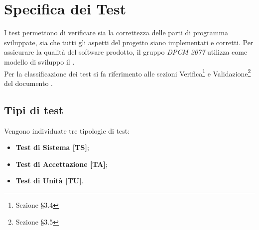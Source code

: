 
\section{Specifica dei Test}
I test permettono di verificare sia la correttezza delle parti di programma sviluppate, sia che tutti gli aspetti del progetto siano implementati e corretti.
Per assicurare la qualità del software prodotto, il gruppo \textit{DPCM 2077} utilizza come modello di sviluppo il .
\\
Per la classificazione dei test si fa riferimento alle sezioni Verifica\footnote{Sezione §3.4} e Validazione\footnote{Sezione §3.5} del documento .
	\subsection{Tipi di test}
	Vengono individuate tre tipologie di test:
	\begin{itemize}
		\item \textbf{Test di Sistema [TS]};
		\item \textbf{Test di Accettazione [TA]};
		\item \textbf{Test di Unità [TU]}.
	\end{itemize}
